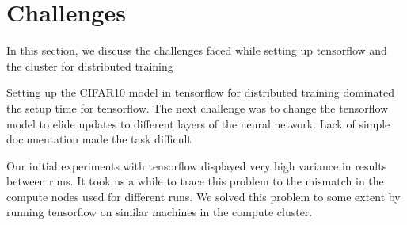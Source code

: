 \section{Challenges}

In this section, we discuss the challenges faced while setting
up tensorflow and the cluster for distributed training

Setting up the CIFAR10 model in tensorflow for distributed training
dominated the setup time for tensorflow. The next challenge was to 
change the tensorflow model to elide updates to different layers
of the neural network. Lack of simple documentation made the task
difficult

Our initial experiments with tensorflow displayed very high variance
in results between runs. It took us a while to trace this problem
to the mismatch in the compute nodes used for different runs. We solved
this problem to some extent by running tensorflow on similar machines
in the compute cluster.


